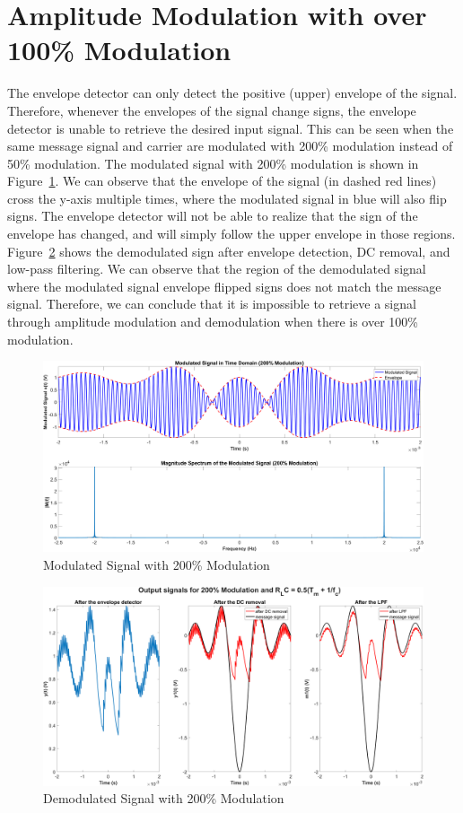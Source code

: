\documentclass[12pt]{article}
\begin{document}
\section*{Amplitude Modulation with over 100\% Modulation}
The envelope detector can only detect the positive (upper) envelope of the signal. Therefore, whenever the envelopes of the signal change signs, the envelope detector is unable to retrieve the desired input signal. This can be seen when the same message signal and carrier are modulated with 200\% modulation instead of 50\% modulation. The modulated signal with 200\% modulation is shown in Figure~\ref{fig:q3_mod}. We can observe that the envelope of the signal (in dashed red lines) cross the y-axis multiple times, where the modulated signal in blue will also flip signs. The envelope detector will not be able to realize that the sign of the envelope has changed, and will simply follow the upper envelope in those regions. Figure~\ref{fig:q3_demod} shows the demodulated sign after envelope detection, DC removal, and low-pass filtering. We can observe that the region of the demodulated signal where the modulated signal envelope flipped signs does not match the message signal. Therefore, we can conclude that it is impossible to retrieve a signal through amplitude modulation and demodulation when there is over 100\% modulation.
\begin{figure}[h!]
    \centering
    \includegraphics[width=\textwidth]{q3_mod}
    \caption{\label{fig:q3_mod}Modulated Signal with 200\% Modulation}
\end{figure}
\begin{figure}[h!]
    \centering
    \includegraphics[width=\textwidth]{q3_demod}
    \caption{\label{fig:q3_demod}Demodulated Signal with 200\% Modulation}
\end{figure}
\end{document}
